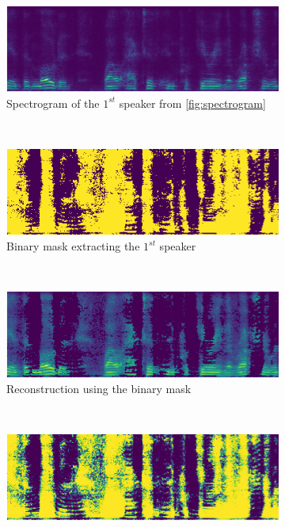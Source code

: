\documentclass[master, tikz, final,11pt, dvipdfmx]{iscs-thesis}
\begin{document}
\begin{figure}[h]
\centering
\begin{subfigure}[b]{0.9\textwidth}
\includegraphics[width=\textwidth]{xnonmix1}
\caption{Spectrogram of the $1^{st}$ speaker from \ref{fig:spectrogram}}
\label{fig:nonmix1} 
\end{subfigure}
\\
\begin{subfigure}[b]{0.45\textwidth}
\includegraphics[width=\textwidth]{ibm1}
\captionsetup{justification=centering}
\caption{Binary mask extracting the  $1^{st}$ speaker}
\label{fig:ibm1} 
\end{subfigure}
~
\begin{subfigure}[b]{0.45\textwidth}
\includegraphics[width=\textwidth]{sepibm1}
\captionsetup{justification=centering}
\caption{Reconstruction using the binary mask}
\label{fig:ibmsep1} 
\end{subfigure}
\\
\begin{subfigure}[b]{0.45\textwidth}
\includegraphics[width=\textwidth]{wf1}

\end{subfigure}
\end{figure}
\end{document}
